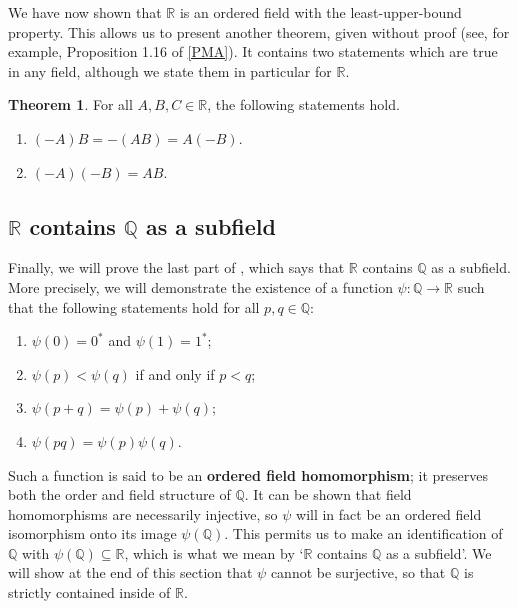 \documentclass[12pt]{article}
\theoremstyle{definition}
\newtheorem{theorem}{Theorem}
\begin{document}
We have now shown that \( \mathbb{R} \) is an ordered field with the least-upper-bound property. This allows us to present another theorem, given without proof (see, for example, Proposition 1.16 of \hyperlink{pma}{[PMA]}). It contains two statements which are true in any field, although we state them in particular for \( \mathbb{R} \).

\begin{theorem}
\label{thm:multiplication_axioms}
    For all \( A, B, C \in \mathbb{R} \), the following statements hold.
    \begin{enumerate}[label = (\alph*)]
        \item \( (-A)B = -(AB) = A(-B) \).

        \item \( (-A)(-B) = AB \).
    \end{enumerate}
\end{theorem}

\subsection{\texorpdfstring{\(\mathbb{R}\)}{} contains \texorpdfstring{\(\mathbb{Q}\)}{} as a subfield}
\label{sec:R_contains_Q}

Finally, we will prove the last part of , which says that \( \mathbb{R} \) contains \( \mathbb{Q} \) as a subfield. More precisely, we will demonstrate the existence of a function \( \psi : \mathbb{Q} \to \mathbb{R} \) such that the following statements hold for all \( p, q \in \mathbb{Q} \):
\begin{enumerate}[label = (H\arabic*)]
    \item \( \psi(0) = 0^* \) and \( \psi(1) = 1^* \);
    \item \( \psi(p) < \psi(q) \) if and only if \( p < q \);
    \item \( \psi(p + q) = \psi(p) + \psi(q) \);
    \item \( \psi(pq) = \psi(p) \psi(q) \).
\end{enumerate}
Such a function is said to be an \textbf{ordered field homomorphism}; it preserves both the order and field structure of \( \mathbb{Q} \). It can be shown that field homomorphisms are necessarily injective, so \( \psi \) will in fact be an ordered field isomorphism onto its image \( \psi(\mathbb{Q}) \). This permits us to make an identification of \( \mathbb{Q} \) with \( \psi(\mathbb{Q}) \subseteq \mathbb{R} \), which is what we mean by `\( \mathbb{R} \) contains \( \mathbb{Q} \) as a subfield'. We will show at the end of this section that \( \psi \) cannot be surjective, so that \( \mathbb{Q} \) is strictly contained inside of \( \mathbb{R} \).
\end{document}
